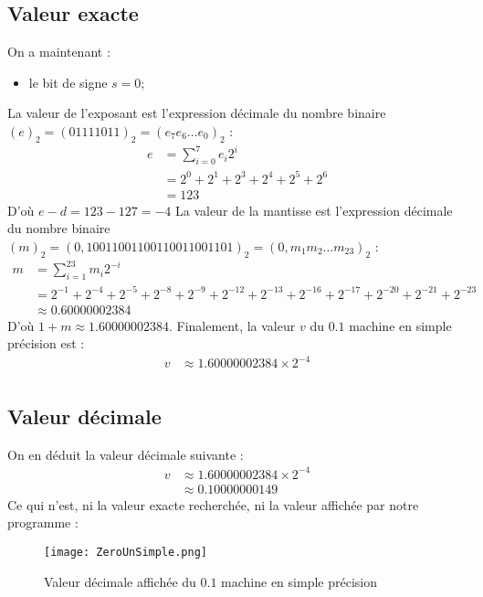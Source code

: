 \documentclass[a4paper, titlepage]{livret} %
\begin{document}
			\subsection{Valeur exacte}
				On a maintenant : 
				\begin{itemize}
					\item le bit de signe $s = 0$;
				\end{itemize}
				La valeur de l'exposant est l'expression décimale du nombre binaire $(e)_{2} = (01111011)_{2} = (e_{7}e_{6}…e_{0})_{2}$ :
				\[\begin{aligned}
					e & = \sum_{i=0}^{7} e_{i}2^{i}\\
				 	  & = 2^{0} + 2^{1} + 2^{3} + 2^{4} + 2^{5} + 2^{6}\\
				 	  & = 123
				\end{aligned}\]
				D'où $e - d = 123 - 127 = -4$
				La valeur de la mantisse est l'expression décimale du nombre binaire $(m)_{2} = (0, 10011001 10011001 1001101)_{2} = (0,m_{1}m_{2}…m_{23})_{2}$ :
				\[\begin{aligned}
					m & = \sum_{i=1}^{23} m_{i}2^{-i}\\
					  & = 2^{-1} + 2^{-4} + 2^{-5} + 2^{-8} + 2^{-9} + 2^{-12} + 2^{-13} + 2^{-16} + 2^{-17} + 2^{-20} + 2^{-21} + 2^{-23}\\
					  & \approx 0.60000002384
				\end{aligned}\]
				D'où $1 + m \approx 1.60000002384$.
				Finalement, la valeur $v$ du $0.1$ machine en simple précision est :
				\[\begin{aligned}
					v & \approx 1.60000002384 \times 2^{-4}\\
				\end{aligned}\]

			\subsection{Valeur décimale}
				On en déduit la valeur décimale suivante :
				\[\begin{aligned}
					v & \approx 1.60000002384 \times 2^{-4}\\
					  & \approx 0.10000000149
				\end{aligned}\]
				Ce qui n'est, ni la valeur exacte recherchée, ni la valeur affichée par notre programme :
				\begin{figure}[!h]
					\centering
  						\texttt{[image: ZeroUnSimple.png]}
  						\caption{Valeur décimale affichée du $0.1$ machine en simple précision}
				\end{figure}
\end{document}
